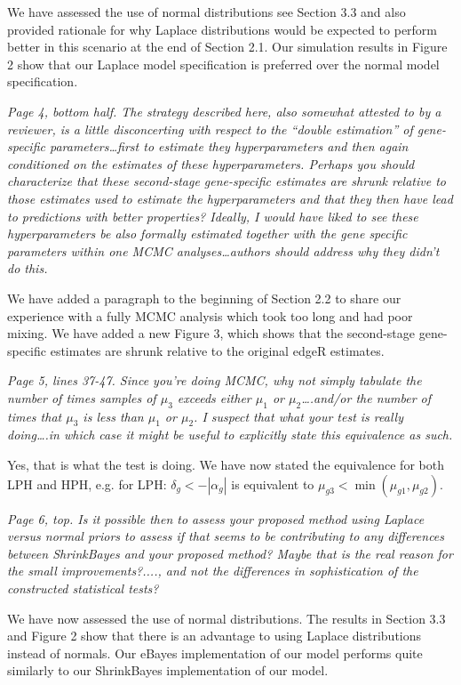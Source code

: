 \documentclass{article}
\newcommand{\comment}[1]{\textit{#1}}
\newcommand{\response}[1]{#1}
\begin{document}
\response{We have assessed the use of normal distributions see Section 3.3 and also provided rationale for why Laplace distributions would be expected to perform better in this scenario at the end of Section 2.1. Our simulation results in Figure 2 show that our Laplace model specification is preferred over the normal model specification.}

\comment{Page 4, bottom half.  The strategy described here, also somewhat attested to by a reviewer, is a little disconcerting with respect to the “double estimation” of gene-specific parameters…first to estimate they hyperparameters and then again conditioned on the estimates of these hyperparameters.  Perhaps you should characterize that these second-stage gene-specific estimates are shrunk relative to those estimates used to estimate the hyperparameters and that they then have lead to predictions with better properties?  Ideally, I would have liked to see these hyperparameters be also formally estimated together with the gene specific parameters within one MCMC analyses…authors should address why they didn’t do this.}

\response{We have added a paragraph to the beginning of Section 2.2 to share our experience with a fully MCMC analysis which took too long and had poor mixing. We have added a new Figure 3, which shows that the second-stage gene-specific estimates are shrunk relative to the original edgeR estimates.}

\comment{Page 5, lines 37-47.  Since you’re doing MCMC, why not simply tabulate the number of times samples of $\mu_3$ exceeds either $\mu_1$ or $\mu_2$….and/or the number of times that $\mu_3$ is less than $\mu_1$ or $\mu_2$.  I suspect that what your test is really doing….in which case it might be useful to explicitly state this equivalence as such.}

\response{Yes, that is what the test is doing. We have now stated the equivalence for both LPH and HPH, e.g. for LPH: $\delta_g < -|\alpha_g|$ is equivalent to $\mu_{g3} < \min(\mu_{g1},\mu_{g2})$.}

\comment{Page 6, top.  Is it possible then to assess your proposed method using Laplace versus normal priors to assess if that seems to be contributing to any differences between ShrinkBayes and your proposed method?  Maybe that is the real reason for the small improvements?...., and not the differences in sophistication of the constructed statistical tests?}

\response{We have now assessed the use of normal distributions. The results in Section 3.3 and Figure 2 show that there is an advantage to using Laplace distributions instead of normals.  Our eBayes implementation of our model performs quite similarly to our ShrinkBayes implementation of our model.}
\end{document}
